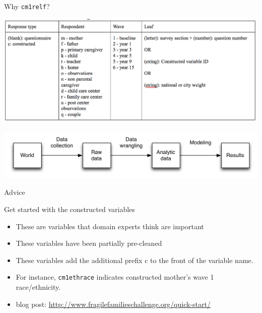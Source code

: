 \documentclass{beamer}
\begin{document}
\begin{frame}

Why \texttt{cm1relf}? \pause

\begin{center}
\includegraphics[width=\textwidth]{figures/ff_variablename_standards}
\end{center}

\end{frame}
\begin{frame}

\begin{center}
\includegraphics[width=\textwidth]{figures/scientific_pipeline}
\end{center}

\end{frame}
\begin{frame}

\begin{center}
\LARGE{Advice}
\end{center}

\end{frame}
\begin{frame}

Get started with the constructed variables
\begin{itemize}
\item These are variables that domain experts think are important
\item These variables have been partially pre-cleaned
\item These variables add the additional prefix \alert{c} to the front of the variable name.
\item For instance, \texttt{cm1ethrace} indicates constructed mother's wave 1 race/ethnicity.
\item blog post: \small{\url{http://www.fragilefamilieschallenge.org/quick-start/}}
\end{itemize}

\end{frame}
\end{document}
